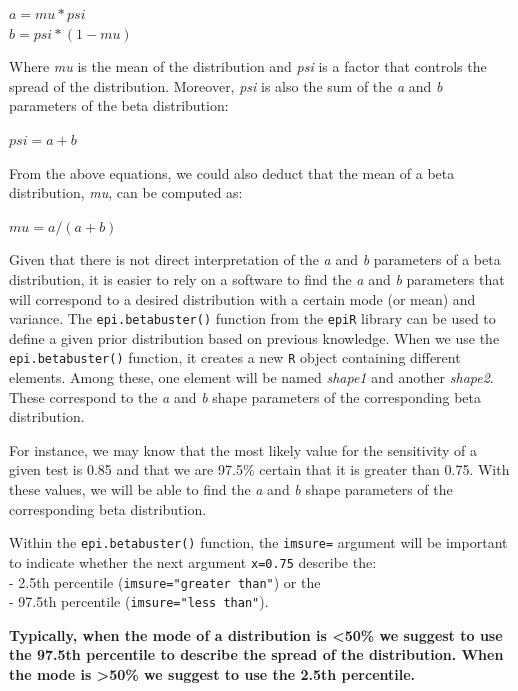 \documentclass[
]{book}
\begin{document}
\(a = mu*psi\)\\
\(b = psi*(1-mu)\)

Where \emph{mu} is the mean of the distribution and \emph{psi} is a factor that controls the spread of the distribution. Moreover, \emph{psi} is also the sum of the \emph{a} and \emph{b} parameters of the beta distribution:

\(psi = a+b\)

From the above equations, we could also deduct that the mean of a beta distribution, \emph{mu}, can be computed as:

\(mu = a/(a+b)\)

Given that there is not direct interpretation of the \emph{a} and \emph{b} parameters of a beta distribution, it is easier to rely on a software to find the \emph{a} and \emph{b} parameters that will correspond to a desired distribution with a certain mode (or mean) and variance. The \texttt{epi.betabuster()} function from the \texttt{epiR} library can be used to define a given prior distribution based on previous knowledge. When we use the \texttt{epi.betabuster()} function, it creates a new \texttt{R} object containing different elements. Among these, one element will be named \emph{shape1} and another \emph{shape2}. These correspond to the \emph{a} and \emph{b} shape parameters of the corresponding beta distribution.

For instance, we may know that the most likely value for the sensitivity of a given test is 0.85 and that we are 97.5\% certain that it is greater than 0.75. With these values, we will be able to find the \emph{a} and \emph{b} shape parameters of the corresponding beta distribution.

Within the \texttt{epi.betabuster()} function, the \texttt{imsure=} argument will be important to indicate whether the next argument \texttt{x=0.75} describe the:\\
- 2.5th percentile (\texttt{imsure="greater\ than"}) or the\\
- 97.5th percentile (\texttt{imsure="less\ than"}).

\textbf{Typically, when the mode of a distribution is \textless50\% we suggest to use the 97.5th percentile to describe the spread of the distribution. When the mode is \textgreater50\% we suggest to use the 2.5th percentile.}
\end{document}
